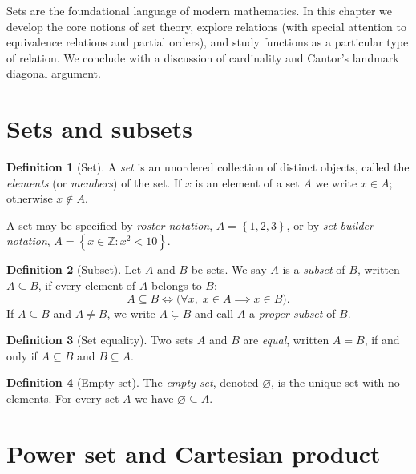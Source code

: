 \documentclass[12pt,a4paper,openany]{book}
\theoremstyle{definition}
\newtheorem{definition}{Definition}[chapter]
\theoremstyle{plain}
\theoremstyle{remark}
\newcommand{\Z}{\mathbb{Z}}
\newcommand{\set}[1]{\left\{#1\right\}}
\begin{document}
\medskip
\noindent
Sets are the foundational language of modern mathematics. In this chapter we
develop the core notions of set theory, explore relations (with special
attention to equivalence relations and partial orders), and study functions
as a particular type of relation. We conclude with a discussion of
cardinality and Cantor's landmark diagonal argument.

\section{Sets and subsets}
\label{sec:sets-subsets}

\begin{definition}[Set]\label{def:set}
A \emph{set} is an unordered collection of distinct objects, called the
\emph{elements} (or \emph{members}) of the set. If $x$ is an element of a
set $A$ we write $x \in A$; otherwise $x \notin A$.
\end{definition}

A set may be specified by \emph{roster notation},
$A = \set{1, 2, 3}$,
or by \emph{set-builder notation},
$A = \set{x \in \Z : x^2 < 10}$.

\begin{definition}[Subset]\label{def:subset}
Let $A$ and $B$ be sets. We say $A$ is a \emph{subset} of $B$, written
$A \subseteq B$, if every element of $A$ belongs to $B$:
\[
  A \subseteq B \iff \bigl(\forall x,\; x \in A \implies x \in B\bigr).
\]
If $A \subseteq B$ and $A \neq B$, we write $A \subsetneq B$ and call $A$
a \emph{proper subset} of $B$.
\end{definition}

\begin{definition}[Set equality]\label{def:set-equality}
Two sets $A$ and $B$ are \emph{equal}, written $A = B$, if and only if
$A \subseteq B$ and $B \subseteq A$.
\end{definition}

\begin{definition}[Empty set]\label{def:empty-set}
The \emph{empty set}, denoted $\varnothing$, is the unique set with no
elements. For every set $A$ we have $\varnothing \subseteq A$.
\end{definition}

\section{Power set and Cartesian product}
\label{sec:powerset-cartesian}
\end{document}

